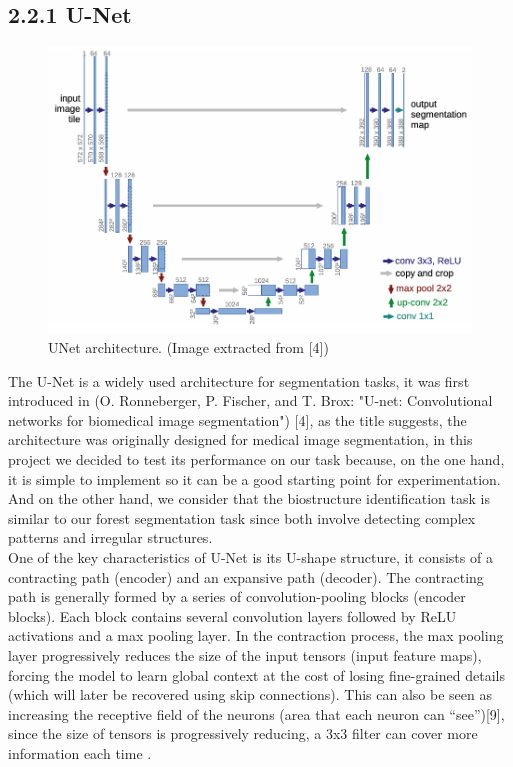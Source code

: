 \subsection{2.2.1 U-Net}
\begin{figure}[H]
 \centering
 \includegraphics[scale=0.6]{IMAGENES/IMG3-UNet.PNG}
 \captionsetup{font=large}
 \caption {UNet architecture. (Image extracted from [4]) }
\end{figure}

The U-Net is a widely used architecture for segmentation tasks, it was first introduced in (O. Ronneberger, P. Fischer, and T. Brox: "U-net: Convolutional networks for biomedical image segmentation") [4], as the title suggests, the architecture was originally designed for medical image segmentation, in this project we decided to test its performance on our task because, on the one hand, it is simple to implement so it can be a good starting point for experimentation. And on the other hand, we consider that the biostructure identification task is similar to our forest segmentation task since both involve detecting complex patterns and irregular structures. \\


One of the key characteristics of U-Net is its U-shape structure, it consists of a contracting path (encoder) and an expansive path (decoder). The contracting path is generally formed by a series of convolution-pooling blocks (encoder blocks). Each block contains several convolution layers followed by ReLU activations and a max pooling layer. In the contraction process, the max pooling layer progressively reduces the size of the input tensors (input feature maps), forcing the model to learn global context at the cost of losing fine-grained details (which will later be recovered using skip connections). This can also be seen as increasing the receptive field of the neurons (area that each neuron can “see”)[9], since the size of tensors is progressively reducing, a 3x3 filter can cover more information each time . \\


